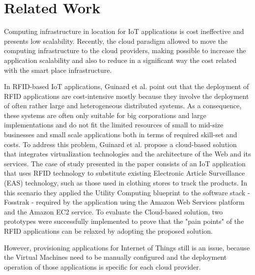 \section{Related Work}
\label{sec:related_work}
Computing infrastructure in location for IoT applications is cost ineffective and presents low scalability.
Recently, the cloud paradigm allowed to move the computing infrastructure to the cloud providers,
making possible to increase the application scalability and also to reduce in a significant way the cost
related with the smart place infrastructure.

In RFID-based IoT applications, Guinard et al. \cite{guinard2011cloud} point out that the
deployment of RFID applications are cost-intensive mostly because they involve the
deployment of often rather large and heterogeneous distributed systems. As a consequence,
these systems are often only suitable for big corporations and large implementations and
do not fit the limited resources of small to mid-size businesses and small scale applications
both in terms of required skill-set and costs. To address this problem, Guinard et al. propose
a cloud-based solution that integrates virtualization technologies and the architecture of
the Web and its services. The case of study presented in the paper consists of an IoT application
that uses RFID technology to substitute existing Electronic Article Surveillance (EAS) technology,
such as those used in clothing stores to track the products. In this scenario they applied the
Utility Computing blueprint to the software stack - Fosstrak - required by the application using
the Amazon Web Services platform and the Amazon EC2 service. To evaluate the Cloud-based solution,
two prototypes were successfully implemented to prove that the "pain points" of the RFID applications
can be relaxed by adopting the proposed solution.

However, provisioning applications for Internet of Things still is an issue, because the Virtual Machines
need to be manually configured and the deployment operation of those applications is specific for each
cloud provider.

